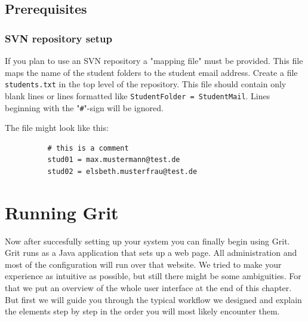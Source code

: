 \documentclass[10pt,a4paper, titlepage, toc=idx]{scrreprt}
\theoremstyle{definition}
\theoremstyle{plain}
\newcommand*{\product}{Grit}
\begin{document}


        \section{Prerequisites}


        \subsection{SVN repository setup}
        If you plan to use an SVN repository a "mapping file" must
        be provided. This file maps the name of the student folders to
        the student email address. Create a file \texttt{students.txt}
        in the top level of the repository. This file should contain
        only blank lines or lines formatted like \texttt{StudentFolder
          = StudentMail}. Lines beginning with the
        "\texttt{\#}"-sign will be ignored.

        The file might look like this:
\begin{lstlisting}
          # this is a comment
          stud01 = max.mustermann@test.de
          stud02 = elsbeth.musterfrau@test.de
\end{lstlisting}

    
       
	\chapter{Running \product}
	Now after succesfully setting up your system you can finally
        begin using \product. \product{} runs as a Java application
        that sets up a web page. All administration and most of the
        configuration will run over that website. We tried to make
        your experience as intuitive as possible, but still there
        might be some ambiguities. For that we put an overview of the
        whole user interface at the end of this chapter. But first we
        will guide you through the typical workflow we designed and
        explain the elements step by step in the order you will most
        likely encounter them.
\end{document}
